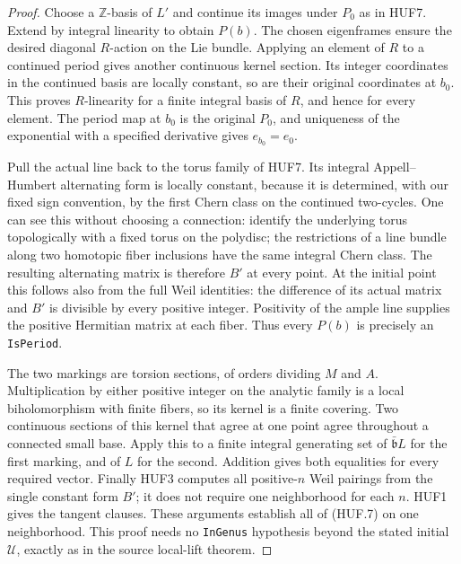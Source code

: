 \documentclass[11pt,a4paper]{article}
\numberwithin{equation}{section}
\theoremstyle{remark}\newtheorem{remark}[theorem]{Remark}
\begin{document}
\begin{proof}
Choose a \(\mathbb Z\)-basis of \(L'\) and continue its
images under \(P_0\) as in HUF7.  Extend by integral
linearity to obtain \(P(b)\).  The chosen eigenframes
ensure the desired diagonal \(R\)-action on the Lie
bundle.  Applying an element of \(R\) to a continued
period gives another continuous kernel section.  Its
integer coordinates in the continued basis are locally
constant, so are their original coordinates at \(b_0\).
This proves \(R\)-linearity for a finite integral basis
of \(R\), and hence for every element.  The period map
at \(b_0\) is the original \(P_0\), and uniqueness of
the exponential with a specified derivative gives
\(e_{b_0}=e_0\).

Pull the actual line back to the torus family of HUF7.
Its integral Appell--Humbert alternating form is locally
constant, because it is determined, with our fixed sign
convention, by the first Chern class on the continued
two-cycles.  One can see this
without choosing a connection: identify the underlying
torus topologically with a fixed torus on the polydisc;
the restrictions of a line bundle along two homotopic
fiber inclusions have the same integral Chern class.
The resulting alternating matrix is therefore \(B'\)
at every point.  At the initial point this follows
also from the full Weil identities: the difference
of its actual matrix and \(B'\) is divisible by
every positive integer.  Positivity of the ample line
supplies the positive Hermitian matrix at each fiber.
Thus every \(P(b)\) is precisely an \texttt{Is\allowbreak Period}.

The two markings are torsion sections, of orders dividing
\(M\) and \(A\).  Multiplication by either positive
integer on the analytic family is a local biholomorphism
with finite fibers, so its kernel is a finite covering.
Two continuous sections of this kernel that agree at
one point agree throughout a connected small base.
Apply this to a finite integral generating set of
\(\bar{\mathfrak b}L\) for the first marking, and of
\(L\) for the second.  Addition gives both equalities
for every required vector.  Finally HUF3 computes
all positive-\(n\) Weil pairings from the single
constant form \(B'\); it does not require one
neighborhood for each \(n\).  HUF1 gives the tangent
clauses.  These arguments establish all of (HUF.7)
on one neighborhood.  This proof needs no
\texttt{In\allowbreak Genus} hypothesis beyond the stated initial
\(\mathcal U\), exactly as in the source local-lift
theorem.
\end{proof}
\end{document}
